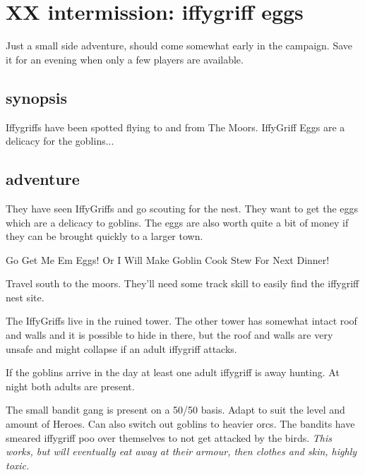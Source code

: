 \newpage
\section*{XX intermission: iffygriff eggs}


Just a small side adventure, should come somewhat early in the campaign. Save it for an evening when only a few players are available.


\subsection*{synopsis}

Iffygriffs have been spotted flying to and from The Moors. IffyGriff Eggs are a delicacy for the goblins...


\subsection*{adventure}

They have seen IffyGriffs and go scouting for the nest. They want to get the eggs which are a delicacy to goblins. The eggs are also worth quite a bit of money if they can be brought quickly to a larger town.

\begin{readoutloud}
Go Get Me Em Eggs! Or I Will Make Goblin Cook Stew For Next Dinner!
\end{readoutloud}

Travel south to the moors. They'll need some track skill to easily find the iffygriff nest site.

The IffyGriffs live in the ruined tower. The other tower has somewhat intact roof and walls and it is possible to hide in there, but the roof and walls are very unsafe and might collapse if an adult iffygriff attacks.

If the goblins arrive in the day at least one adult iffygriff is away hunting. At night both adults are present.

The small bandit gang is present on a 50/50 basis. Adapt to suit the level and amount of Heroes. Can also switch out goblins to heavier orcs. The bandits have smeared iffygriff poo over themselves to not get attacked by the birds. \emph{This works, but will eventually eat away at their armour, then clothes and skin, highly toxic.}


